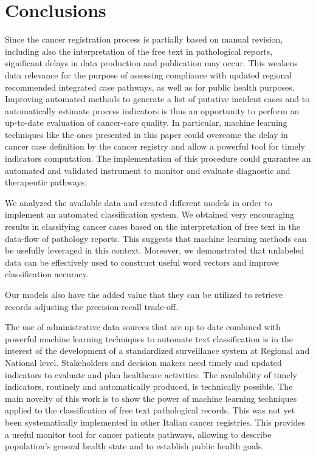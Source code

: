 \chapter{Conclusions}
Since the cancer registration process is partially based on manual
revision, including also the interpretation of the free text in
pathological reports, significant delays in data production and
publication may occur. This weakens data relevance for the purpose of
assessing compliance with updated regional recommended integrated case
pathways, as well as for public health purposes. Improving automated
methods to generate a list of putative incident cases and to
automatically estimate process indicators is thus an opportunity to
perform an up-to-date evaluation of cancer-care quality. In
particular, machine learning techniques like the ones presented in
this paper could overcome the delay in cancer case definition by the
cancer registry and allow a powerful tool for timely indicators
computation. The implementation of this procedure could guarantee an
automated and validated instrument to monitor and evaluate diagnostic
and therapeutic pathways.

We analyzed the available data and created different models in order
to implement an automated classification system. We obtained very
encouraging results in classifying cancer cases based on the
interpretation of free text in the data-flow of pathology
reports. This suggests that machine learning methods can be usefully
leveraged in this context. Moreover, we demonstrated that unlabeled
data can 
be effectively used to construct useful word vectors and improve
classification accuracy. 

Our models also have the added value that they can be
utilized to retrieve records adjusting the precision-recall trade-off.

The use of administrative data sources that are up to date combined
with powerful machine learning techniques to automate text
classification is in the interest of the development of a standardized
surveillance system at Regional and National level. Stakeholders and
decision makers need timely and updated indicators to evaluate and
plan healthcare activities. The availability of timely indicators,
routinely and automatically produced, is technically possible. The
main novelty of this work is to show the power of machine learning
techniques applied to the classification of free text pathological
records. This was not yet been systematically implemented in other
Italian cancer registries. This provides a useful monitor tool for
cancer patients pathways, allowing to describe population’s general
health state and to establish public health goals.

